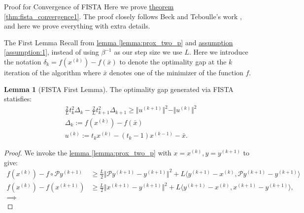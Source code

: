 \documentclass[]{article}
\theoremstyle{definition}
\newtheorem{lemma}{Lemma}[subsection]  %
\begin{document}
\appendix
\begin{section}{Proof for Convergence of FISTA}
    Here we prove \hyperref[thm:fista_convergence1]{theorem \ref*{thm:fista_convergence1}}. The proof closely follows Beck and Teboulle's work \cite{paper:FISTA}, and here we prove everything with extra details. 
    \begin{subsection}{The First Lemma}
        Recall from \hyperref[lemma:prox_two_p]{lemma \ref*{lemma:prox_two_p}}
        and \hyperref[assumption:1]{assumption \ref*{assumption:1}}, instead of using $\beta^{-1}$ as our step size we use $L$. Here we introduce the notation $\delta_k = f(x^{(k)}) - f(\bar x)$ to denote the optimality gap at the $k$ iteration of the algorithm where $\bar x$ denotes one of the minimizer of the function $f$. 
        \begin{lemma}[FISTA First Lemma]\label{lemma:fista_first_lemma}
            The optimality gap generated via FISTA statisfies: 
            \begin{align*}
                & 
                \frac{2}{L}t^2_k \Delta_k - \frac{2}{L}t^2_{k + 1} \Delta_{k + 1} 
                \ge 
                \Vert u^{(k + 1)}\Vert^2 - \Vert u^{(k)}\Vert^2
                \\
                & \Delta_k := f(x^{(k)}) - f(\bar x)
                \\
                & u^{(k)} := t_k x^{(k)} - (t_k - 1)x^{(k - 1)} - \bar x.
            \end{align*}
        \end{lemma}
        \begin{proof}
            We invoke the \hyperref[lemma:prox_two_p]{lemma \ref*{lemma:prox_two_p}} with $x = x^{(k)}, y = y^{(k +1)}$ to give: 
            \begin{align*}\label{lemma:fista_first_lemma_1}
                f(x^{(k)}) - f\circ \mathcal P y^{(k + 1)}
                & \ge 
                \frac{L}{2}\Vert \mathcal Py^{(k + 1)} - y^{(k + 1)}\Vert^2 + 
                L \langle y^{(k + 1)} - x^{(k)}, 
                    \mathcal Py^{(k + 1)} - y^{(k + 1)}
                \rangle
                \\
                f(x^{(k)}) - f(x^{(k + 1)}) 
                & \ge 
                \frac{L}{2}\Vert x^{(k + 1)} - y^{(k + 1)}\Vert^2 + 
                L 
                \langle 
                    y^{(k + 1)} - x^{(k)}, 
                    x^{(k + 1)} - y^{(k + 1)}
                \rangle, 
                \\
                \implies

\end{align*}
\end{proof}
\end{subsection}
\end{section}
\end{document}

